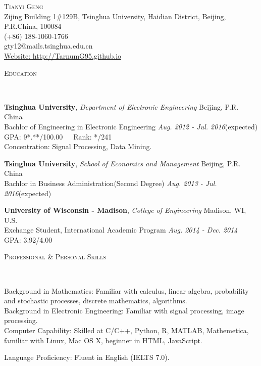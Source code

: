 \documentclass[9pt]{article}
\newenvironment{changemargin}[2]{%
  \begin{list}{}{%
    \setlength{\topsep}{0pt}%
    \setlength{\leftmargin}{#1}%
    \setlength{\rightmargin}{#2}%
    \setlength{\listparindent}{\parindent}%
    \setlength{\itemindent}{\parindent}%
    \setlength{\parsep}{\parskip}%
  }%
  \item[]}{\end{list}
}
\newcommand{\lineover}{
	\begin{changemargin}{-0.05in}{-0.05in}
		\vspace*{-8pt}
		\hrulefill \\
		\vspace*{-2pt}
	\end{changemargin}
}
\newcommand{\header}[1]{
	\begin{changemargin}{-0.5in}{-0.5in}
		\scshape{#1}\\
  	\lineover
	\end{changemargin}
}
\newcommand{\contact}[5]{
	\begin{changemargin}{-0.5in}{-0.5in}
		\begin{center}
			{\Large \scshape {#1}}\\ \smallskip
			{#2}\\ \smallskip 
			{#3}\\ \smallskip
			{#4}\\ \smallskip
			{#5}\smallskip
		\end{center}
	\end{changemargin}
}
\newenvironment{body} {
	\vspace*{-16pt}
	\begin{changemargin}{-0.25in}{-0.5in}
  }	
	{\end{changemargin}
}
\begin{document}
\contact{Tianyi Geng}{Zijing Building 1\#129B, Tsinghua University, Haidian District, Beijing, P.R.China, 100084}{(+86) 188-1060-1766}{gty12@mails.tsinghua.edu.cn}{\href{http://TarnumG95.github.io}{Website: http://TarnumG95.github.io}}

\header{Education}

\begin{body}
	\vspace{14pt}

	\textbf{Tsinghua University}, \emph{Department of Electronic Engineering} \hfill Beijing, P.R. China \\
Bachlor of Engineering in Electronic Engineering \hfill \emph{Aug. 2012 - Jul. 2016}(expected){} \\
GPA: 9*.**/100.00\ \ \ Rank: */241\\
Concentration: Signal Processing, Data Mining. \\
\vspace{6pt}

	\textbf{Tsinghua University}, \emph{School of Economics and Management} \hfill Beijing, P.R. China \\
Bachlor in Business Administration(Second Degree) \hfill \emph{Aug. 2013 - Jul. 2016}(expected){} \\
\vspace{6pt}

	\textbf{University of Wisconsin - Madison}, \emph{College of Engineering} \hfill Madison, WI, U.S. \\
	Exchange Student, International Academic Program \hfill \emph{Aug. 2014 - Dec. 2014}{} \\
GPA: 3.92/4.00\\


\end{body}

\smallskip
\smallskip

\header{Professional \& Personal Skills}

\begin{body}
	\vspace{14pt}
	Background in Mathematics: Familiar with calculus, linear algebra, probability and stochastic processes, discrete mathematics, algorithms.\\
	\smallskip
	Background in Electronic Engineering: Familiar with signal processing, image processing.\\
	\smallskip
	Computer Capability: Skilled at C/C++, Python, R, MATLAB, Mathemetica, familiar with Linux, Mac OS X, beginner in HTML, JavaScript.\\
	\smallskip

	Language Proficiency: Fluent in English (IELTS 7.0).\\
\end{body}
\smallskip
\smallskip
\end{document}
